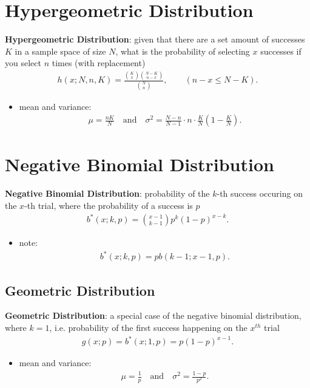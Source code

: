 \documentclass[10pt]{article}
\begin{document}
\section{Hypergeometric Distribution}
\begin{definition}
    \textbf{Hypergeometric Distribution}: given that there are a set amount of successes $K$ in a sample space of size $N$, what is the probability of selecting $x$ successes if you select $n$ times (with replacement)
    \begin{gather*}
        h(x;N,n,K) = \frac{{K \choose x} {N-K \choose n-x}}{{N \choose n}}, \quad \quad (n-x \le N-K)
    .\end{gather*}
    \begin{itemize}
        \item mean and variance:
            \begin{gather*}
                \mu = \frac{nK}{N} \quad \text{and} \quad \sigma^2 = \frac{N-n}{N-1}\cdot n\cdot \frac{K}{N}\left( 1-\frac{K}{N} \right) 
            .\end{gather*}
    \end{itemize}
\end{definition}

\section{Negative Binomial Distribution}
\begin{definition}
    \textbf{Negative Binomial Distribution}: probability of the $k$-th success occuring on the $x$-th trial, where the probability of a success is $p$
    \begin{gather*}
        b^*(x;k,p) = {x-1 \choose k-1} p^k(1-p)^{x-k}
    .\end{gather*}
    \begin{itemize}
        \item note:
            \begin{gather*}
                b^*(x;k,p) = pb(k-1;x-1,p)
            .\end{gather*}
    \end{itemize}
\end{definition}


\subsection{Geometric Distribution}
\begin{definition}
    \textbf{Geometric Distribution}: a special case of the negative binomial distribution, where $k=1$, i.e. probability of the first success happening on the $x^{th}$ trial
    \begin{gather*}
        g(x;p) = b^*(x;1,p) = p(1-p)^{x-1}
    .\end{gather*}
    \begin{itemize}
        \item mean and variance: 
            \begin{gather*}
                \mu = \frac{1}{p} \quad \text{and} \quad \sigma^2 = \frac{1-p}{p^2}
            .\end{gather*}
    \end{itemize}
\end{definition}
\end{document}
